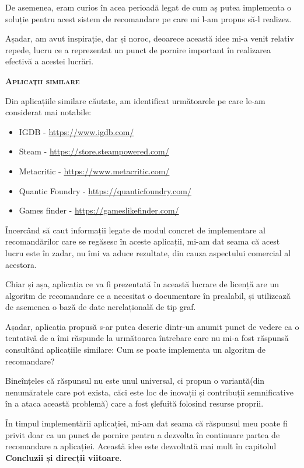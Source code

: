 \documentclass[12pt,a4paper]{report}
\begin{document}
	De asemenea, eram curios în acea perioadă legat de cum aș putea implementa o soluție pentru acest sistem de recomandare pe care mi l-am propus să-l realizez.
	
	Așadar, am avut inspirație, dar și noroc, deoarece această idee mi-a venit relativ repede, lucru ce a reprezentat un punct de pornire important în realizarea efectivă a acestei lucrări.
	
	\newpage
	

	{\scshape\normalsize \textbf{Aplicații similare} \par}
	
	\bigskip
	
	Din aplicațiile similare căutate, am identificat următoarele pe care le-am considerat mai notabile:
	
\begin{itemize}
  \item IGDB - \url{https://www.igdb.com/}
  \item Steam - \url{https://store.steampowered.com/}
  \item Metacritic - \url{https://www.metacritic.com/}
  \item Quantic Foundry - \url{https://quanticfoundry.com/}
  \item Games finder - \url{https://gameslikefinder.com/}
\end{itemize}


Încercând să caut informații legate de modul concret de implementare al recomandărilor care se regăsesc în aceste aplicații, mi-am dat seama că acest lucru este în zadar, nu îmi va aduce rezultate, din cauza aspectului comercial al acestora.

Chiar și așa, aplicația ce va fi prezentată în această lucrare de licență are un algoritm de recomandare ce a necesitat o documentare în prealabil, și utilizează de asemenea o bază de date nerelațională de tip graf.

Așadar, aplicația propusă s-ar putea descrie dintr-un anumit punct de vedere ca o tentativă de a îmi răspunde la următoarea întrebare care nu mi-a fost răspunsă consultând aplicațiile similare: Cum se poate implementa un algoritm de recomandare?

Bineînțeles că răspunsul nu este unul universal, ci propun o variantă(din nenumăratele care pot exista, căci este loc de inovații și contribuții semnificative în a ataca această problemă) care a fost șlefuită folosind resurse proprii.

În timpul implementării aplicației, mi-am dat seama că răspunsul meu poate fi privit doar ca un punct de pornire pentru a dezvolta în continuare partea de recomandare a aplicației. Această idee este dezvoltată mai mult în capitolul \textbf{Concluzii și direcții viitoare}.
	
\end{document}
